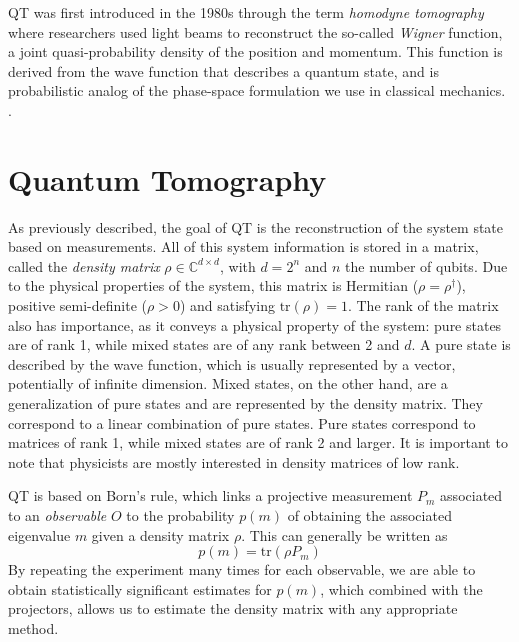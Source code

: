 \documentclass[12pt]{memoir}
\newcommand{\tr}{\text{tr}}
\begin{document}
QT was first introduced in the 1980s through the term \textit{homodyne tomography} where researchers used light beams to reconstruct the so-called \textit{Wigner} function, a joint quasi-probability density of the position and momentum. This function is derived from the wave function that describes a quantum state, and is probabilistic analog of the phase-space formulation we use in classical mechanics.
\cite{Toninelli19,dariano2003,wignerfunction}.



\section{Quantum Tomography} \label{introduction:quantum-tomography}

As previously described, the goal of QT is the reconstruction of the system state based on measurements. All of this system information is stored in a matrix, called the \textit{density matrix} $\rho \in \mathbb{C}^{d \times d}$, with $d = 2^n$ and $n$ the number of qubits. Due to the physical properties of the system, this matrix is Hermitian ($\rho = \rho^{\dagger}$), positive semi-definite ($\rho > 0$) and satisfying $\tr(\rho) = 1$. The rank of the matrix also has importance, as it conveys a physical property of the system: pure states are of rank 1, while mixed states are of any rank between 2 and $d$. A pure state is described by the wave function, which is usually represented by a vector, potentially of infinite dimension. Mixed states, on the other hand, are a generalization of pure states and are represented by the density matrix. They correspond to a linear combination of pure states. Pure states correspond to matrices of rank 1, while mixed states are of rank 2 and larger. It is important to note that physicists are mostly interested in density matrices of low rank.\medbreak

QT is based on Born's rule, which links a projective measurement $P_m$ associated to an \textit{observable} $O$ to the probability $p(m)$ of obtaining the associated eigenvalue $m$ given a density matrix $\rho$. This can generally be written as 
\begin{equation}
    p(m) = \tr(\rho P_m)
\end{equation}
By repeating the experiment many times for each observable, we are able to obtain statistically significant estimates for $p(m)$, which combined with the projectors, allows us to estimate the density matrix with any appropriate method.
\end{document}
